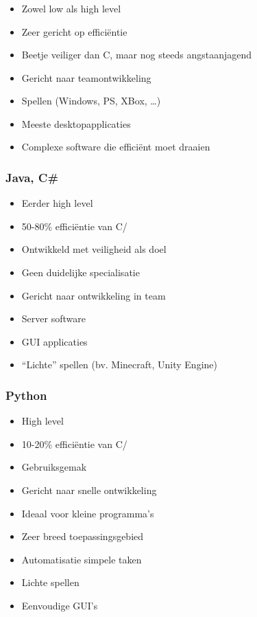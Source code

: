 \begin{frame}
  \frametitle{\cpp}
  \begin{itemize}
    \item Zowel low als high level
    \item Zeer gericht op effici\"entie
    \item Beetje veiliger dan C, maar nog steeds angstaanjagend
    \item Gericht naar teamontwikkeling
  \end{itemize}
  \vskip4mm
  \begin{itemize}
    \item Spellen (Windows, PS, XBox, \dots)
    \item Meeste desktopapplicaties
    \item Complexe software die effici\"ent moet draaien
  \end{itemize}
\end{frame}

\begin{frame}
  \frametitle{Java, C\#}
  \begin{itemize}
    \item Eerder high level
    \item 50-80\% effici\"entie van C/\cpp
    \item Ontwikkeld met veiligheid als doel
    \item Geen duidelijke specialisatie
    \item Gericht naar ontwikkeling in team
  \end{itemize}
  \vskip4mm
  \begin{itemize}
    \item Server software
    \item GUI applicaties
    \item ``Lichte'' spellen (bv. Minecraft, Unity Engine)
  \end{itemize}
\end{frame}

\begin{frame}
  \frametitle{Python}
  \begin{itemize}
    \item High level
    \item 10-20\% effici\"entie van C/\cpp
    \item Gebruiksgemak
    \item Gericht naar snelle ontwikkeling
    \item Ideaal voor kleine programma's
    \item Zeer breed toepassingsgebied
  \end{itemize}
  \vskip4mm
  \begin{itemize}
    \item Automatisatie simpele taken
    \item Lichte spellen
    \item Eenvoudige GUI's
  \end{itemize}
\end{frame}

